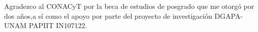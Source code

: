 
\begin{acknowledgements}


Agradezco al CONACyT  por la beca de estudios de posgrado que me otorgó por dos años,a sí como el apoyo por parte del proyecto de investigación DGAPA-UNAM PAPIIT IN107122.

\end{acknowledgements}




